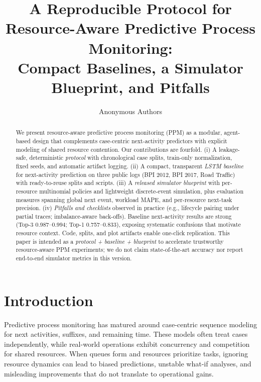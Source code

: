 \documentclass{article}
\title{A Reproducible Protocol for Resource-Aware Predictive Process Monitoring:\\
	Compact Baselines, a Simulator Blueprint, and Pitfalls}
\author{Anonymous Authors}
\theoremstyle{plain}
\theoremstyle{definition}
\theoremstyle{remark}
\begin{document}
	\maketitle
	
	\begin{abstract}
		We present resource-aware predictive process monitoring (PPM) as a modular, agent-based design that complements case-centric next-activity predictors with explicit modeling of shared resource contention. Our contributions are fourfold. (i) A leakage-safe, deterministic \emph{protocol} with chronological case splits, train-only normalization, fixed seeds, and automatic artifact logging. (ii) A compact, transparent \emph{LSTM baseline} for next-activity prediction on three public logs (BPI 2012, BPI 2017, Road Traffic) with ready-to-reuse splits and scripts. (iii) A \emph{released simulator blueprint} with per-resource multinomial policies and lightweight discrete-event simulation, plus evaluation measures spanning global next event, workload MAPE, and per-resource next-task precision. (iv) \emph{Pitfalls and checklists} observed in practice (e.g., lifecycle pairing under partial traces; imbalance-aware back-offs). Baseline next-activity results are strong (Top-3 0.987--0.994; Top-1 0.757--0.833), exposing systematic confusions that motivate resource context. Code, splits, and plot artifacts enable one-click replication. This paper is intended as a \emph{protocol + baseline + blueprint} to accelerate trustworthy resource-aware PPM experiments; we do not claim state-of-the-art accuracy nor report end-to-end simulator metrics in this version.
	\end{abstract}
	
	
	\section{Introduction}
	\label{sec:intro}
	Predictive process monitoring has matured around case-centric sequence modeling for next activities, suffixes, and remaining time. These models often treat cases independently, while real-world operations exhibit concurrency and competition for shared resources. When queues form and resources prioritize tasks, ignoring resource dynamics can lead to biased predictions, unstable what-if analyses, and misleading improvements that do not translate to operational gains.
	
\end{document}
